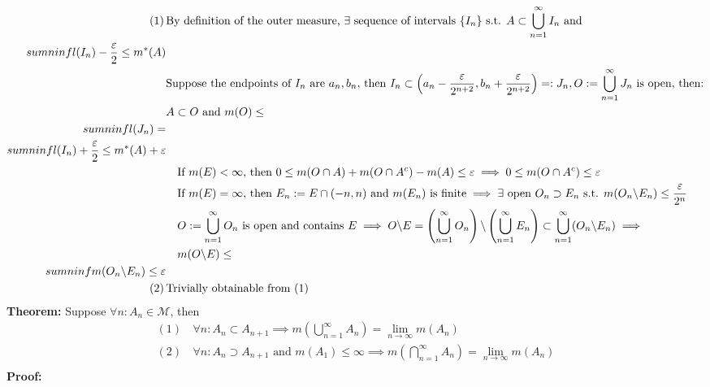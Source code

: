 \documentclass{article}
\newcommand{\sumninf}{\sum\limits_{n=1}^\infty}
\newcommand{\infcap}{\bigcap\limits_{n=1}^\infty}
\newcommand{\infcup}{\bigcup\limits_{n=1}^\infty}
\newcommand{\limninf}{\lim\limits_{n\to\infty}}
\newcommand{\st}{\mbox{ s.t. }}
\newcommand{\0}{{\bf{0}}}
\newcommand{\1}{{\bf{1}}}
\begin{document}
\begin{equation}
\begin{split}
    (1)\,&\mbox{By definition of the outer measure, }\exists\mbox{ sequence of intervals }\{I_n\}\st A\subset\infcup I_n\mbox{ and }\\sumninf l(I_n)-\frac{\varepsilon}{2}\le m^*(A)\\
    &\mbox{Suppose the endpoints of }I_n\mbox{ are }a_n,b_n\mbox{, then }I_n\subset\left(a_n-\frac{\varepsilon}{2^{n+2}},b_n+\frac{\varepsilon}{2^{n+2}}\right)=:J_n, O:=\infcup J_n\mbox{ is open, then:}\\
    &A\subset O\mbox{ and }m(O)\le\\sumninf l(J_n)=\\sumninf l(I_n)+\frac{\varepsilon}{2}\le m^*(A)+\varepsilon\\
    &\quad\mbox{If }m(E)<\infty\mbox{, then }0\le m(O\cap A)+m(O\cap A^c)-m(A)\le\varepsilon\implies0\le m(O\cap A^c)\le\varepsilon\\
    &\quad\mbox{If }m(E)=\infty\mbox{, then }E_n:=E\cap(-n,n)\mbox{ and }m(E_n)\mbox{ is finite}\implies\exists\mbox{ open }O_n\supset E_n\st m(O_n\symbol{92}E_n)\le\frac{\varepsilon}{2^n}\\
    &\quad O:=\infcup O_n\mbox{ is open and contains }E\implies O\symbol{92}E=\left(\infcup O_n\right){\symbol{92}}\left(\infcup E_n\right)\subset\infcup(O_n\symbol{92}E_n)\implies\\
    &\quad m(O\symbol{92}E)\le\\sumninf m(O_n\symbol{92}E_n)\le\varepsilon\\
    (2)\,&\mbox{Trivially obtainable from (1)}
\end{split}
\end{equation}
\textbf{Theorem:} Suppose $\forall n:A_n\in\mathcal{M}$, then
\begin{equation}
\begin{split}
    (1)\,&\forall n:A_n\subset A_{n+1}\implies m\left(\infcup A_n\right)=\limninf m(A_n)\\
    (2)\,&\forall n:A_n\supset A_{n+1}\mbox{ and }m(A_1)\le\infty\implies m\left(\infcap A_n\right)=\limninf m(A_n)\\
\end{split}
\end{equation}
\textbf{Proof:}
\end{document}
